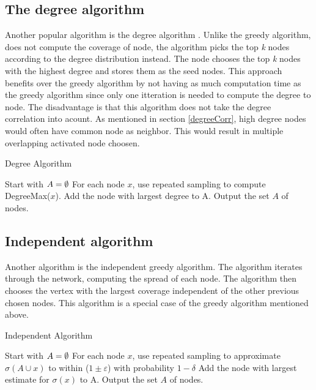 \subsection{The degree algorithm}
Another popular algorithm is the degree algorithm \cite{greedyInfluenc2005}. Unlike the greedy algorithm, does not compute the coverage of node, the algorithm picks the top \textit{k} nodes according to the degree distribution instead. The node chooses the top \textit{k} nodes with the highest degree and stores them as the seed nodes. This approach benefits over the greedy algorithm by not having as much computation time as the greedy algorithm since only one itteration is needed to compute the degree to node. The disadvantage is that this algorithm does not take the degree correlation into acount. As mentioned in section \ref{degreeCorr}, high degree nodes would often have common node as neighbor. This would result in multiple overlapping activated node choosen.

\begin{algorithm}
\caption{Degree Algorithm}
\begin{algorithmic}[1]
\State Start with $A = \emptyset$
\State For each node $x$, use repeated sampling to compute DegreeMax($x$).
\State Add the node with largest degree to A.
\EndWhile
\State Output the set $A$ of nodes.
\end{algorithmic}
\end{algorithm}

\subsection{Independent algorithm}
Another algorithm is the independent greedy algorithm. The algorithm iterates through the network, computing the spread of each node. The algorithm then chooses the vertex with the largest coverage independent of the other previous chosen nodes. This algorithm is a special case of the greedy algorithm mentioned above.

\begin{algorithm}
\caption{Independent Algorithm}
\begin{algorithmic}[1]
\State Start with $A = \emptyset$
\State For each node $x$, use repeated sampling to approximate $\sigma(A \cup {x}) $ to within ($1 \pm \varepsilon$) with probability
$1 − \delta$
\State Add the node with largest estimate for $\sigma({x})$ to A.
\EndWhile
\State Output the set $A$ of nodes.
\end{algorithmic}
\end{algorithm}




